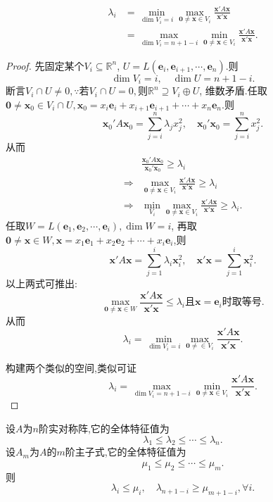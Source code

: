 \begin{theorem}
  \label{thm:Complex-normal-operator5}
  \begin{align*}
    \lambda_i& = \min_{\dim V_i=i}\max_{\bm{0}\neq\bm{x}\in V_i}\frac{\bm{x}'A\bm{x}}{\bm{x}'\bm{x}}\\
    & = \max_{\dim V_i=n+1-i}\min_{\bm{0}\neq\bm{x}\in V_i}\frac{\bm{x}'A\bm{x}}{\bm{x}'\bm{x}}.
  \end{align*}

\end{theorem}

\begin{proof}
  先固定某个$V_i\subseteq\mathbb{R}^n$,
  $U=L(\bm{e}_i,\bm{e}_{i+1},\cdots,\bm{e}_n)$.则
  \[
    \dim V_i=i, \quad \dim U=n+1-i.
  \]
  断言$V_i\cap U \neq 0, \because\text{若}V_i\cap U = 0,
  \text{则}\mathbb{R}^n\supseteq V_i\oplus U$,
  维数矛盾.任取$\bm{0} \neq \bm{x}_0\in V_i\cap U,
  \bm{x}_0=x_i\bm{e}_i+x_{i+1}\bm{e}_{i+1}+\cdots+x_n\bm{e}_n$.则
  \[
    \bm{x}_0'A\bm{x}_0=\sum_{j=i}^n\lambda_jx_j^2, \quad \bm{x}_0'\bm{x}_0=\sum_{j=i}^nx_j^2.
  \]
  从而
  \begin{align*}
    & \frac{\bm{x}_0'A\bm{x}_0}{\bm{x}_0'\bm{x}_0} \geq \lambda_i\\
    \Longrightarrow & \max_{\bm{0}\neq\bm{x}\in V_i}\frac{\bm{x}'A\bm{x}}{\bm{x}'\bm{x}} \geq \lambda_i\\
    \Longrightarrow & \min_{V_i}\max_{\bm{0}\neq\bm{x}\in V_i}\frac{\bm{x}'A\bm{x}}{\bm{x}'\bm{x}} \geq \lambda_i.
  \end{align*}
  任取$W=L(\bm{e}_1,\bm{e}_2,\cdots,\bm{e}_i), \dim W=i$,
  再取$\bm{0}\neq \bm{x} \in W,
  \bm{x}=x_1\bm{e}_1+x_2\bm{e}_2+\cdots+x_i\bm{e}_i$,则
  \[
    \bm{x}'A\bm{x} = \sum_{j=1}^i\lambda_i\bm{x}_i^2,\quad
    \bm{x}'\bm{x}=\sum_{j=1}^i\bm{x}_i^2.
  \]
  以上两式可推出:
  \[
    \max_{\bm{0}\neq\bm{x}\in W}\frac{\bm{x}'A\bm{x}}{\bm{x}'\bm{x}} \leq \lambda_i
    \text{且}\bm{x}=\bm{e}_i\text{时取等号}.
  \]
  从而
  \[
    \lambda_i=\min_{\dim V_i=i}\max_{\bm{0}\neq\in V_i}
    \frac{\bm{x}'A\bm{x}}{\bm{x}'\bm{x}}.
  \]

  构建两个类似的空间,类似可证
  \[
    \lambda_i = \max_{\dim V_i=n+1-i}\min_{\bm{0}\neq\bm{x}\in V_i}\frac{\bm{x}'A\bm{x}}{\bm{x}'\bm{x}}.
  \]
\end{proof}

\begin{theorem}[Cauchy交错定理]
  \label{thm:Complex-normal-operator6}
  设$A$为$n$阶实对称阵,它的全体特征值为
  \[
    \lambda_1 \leq \lambda_2 \leq \cdots \leq \lambda_n.
  \]
  设$A_m$为$A$的$m$阶主子式,它的全体特征值为
  \[
    \mu_1 \leq \mu_2 \leq \cdots \leq \mu_m.
    \]
  则
  \[
    \lambda_i \leq \mu_i, \quad \lambda_{n+1-i} \geq \mu_{m+1-i}, 
    \forall i.
  \]
\end{theorem}

